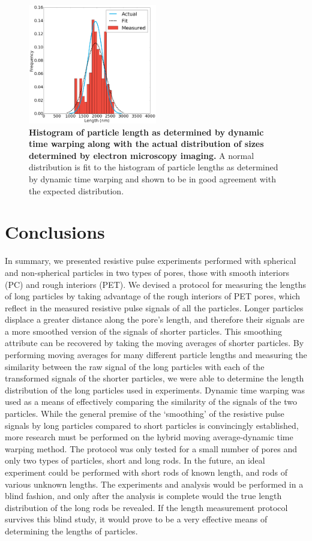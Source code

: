 			
			\begin{figure}
				\includegraphics[width=0.5\textwidth]{dtwfit.png}
				\caption{\textbf{Histogram of particle length as determined by dynamic time warping along with the actual distribution of sizes determined by electron microscopy imaging.} A normal distribution is fit to the histogram of particle lengths as determined by dynamic time warping and shown to be in good agreement with the expected distribution.}
				\label{fig:dtwfit}
			\end{figure}
		
	\section{Conclusions}
		In summary, we presented resistive pulse experiments performed with spherical and non-spherical particles in two types of pores, those with smooth interiors (PC) and rough interiors (PET). We devised a protocol for measuring the lengths of long particles by taking advantage of the rough interiors of PET pores, which reflect in the measured resistive pulse signals of all the particles. Longer particles displace a greater distance along the pore's length, and therefore their signals are a more smoothed version of the signals of shorter particles. This smoothing attribute can be recovered by taking the moving averages of shorter particles. By performing moving averages for many different particle lengths and measuring the similarity between the raw signal of the long particles with each of the transformed signals of the shorter particles, we were able to determine the length distribution of the long particles used in experiments. Dynamic time warping was used as a means of effectively comparing the similarity of the signals of the two particles. While the general premise of the `smoothing' of the resistive pulse signals by long particles compared to short particles is convincingly established, more research must be performed on the hybrid moving average-dynamic time warping method. The protocol was only tested for a small number of pores and only two types of particles, short and long rods. In the future, an ideal experiment could be performed with short rods of known length, and rods of various unknown lengths. The experiments and analysis would be performed in a blind fashion, and only after the analysis is complete would the true length distribution of the long rods be revealed. If the length measurement protocol survives this blind study, it would prove to be a very effective means of determining the lengths of particles.
		
